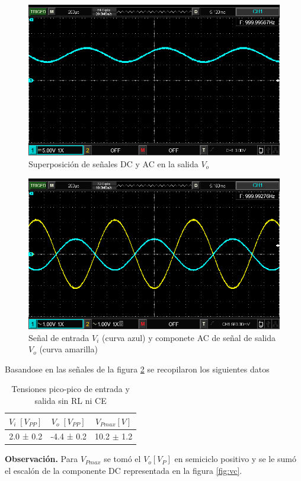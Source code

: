 \documentclass[12pt, a4paper]{article}
\begin{document}
    \begin{figure}[h!]
        \centering
        \includegraphics[height=5cm\textwidth]{VCsRLsCE.png}
        \caption{Superposición de señales DC y AC en la salida $V_o$}
        \label{fig:vo}
    \end{figure}

    \begin{figure}[h!]
        \centering
        \includegraphics[height=5cm\textwidth]{ViosRLsCE.png}
        \caption{Señal de entrada $V_i$ (curva azul) y componete AC de señal de salida $V_o$ (curva amarilla)}
        \label{fig:vio1}
    \end{figure}

    \newpage

    Basandose en las señales de la figura \ref{fig:vio1} se recopilaron los siguientes datos

    \begin{table}[h!]
        \centering
        \caption{Tensiones pico-pico de entrada y salida sin RL ni CE}
        \label{tab:vio1}
        \begin{tabular}{|c|c|c|} \hline
            $V_i \; [V_{PP}]$  &  $V_o \; [V_{PP}]$   &  $V_{Pmax} [V]$\\ \hline
            2.0 ± 0.2            &       -4.4 ± 0.2     &  10.2 $\pm$ 1.2 \\ \hline
        \end{tabular}
    \end{table}

    {\bf Observación.} Para $V_{Pmax}$ se tomó el $V_o [V_P]$ en semiciclo positivo y se le sumó el escalón de la componente DC representada en la figura \ref{fig:vc}.
\end{document}
